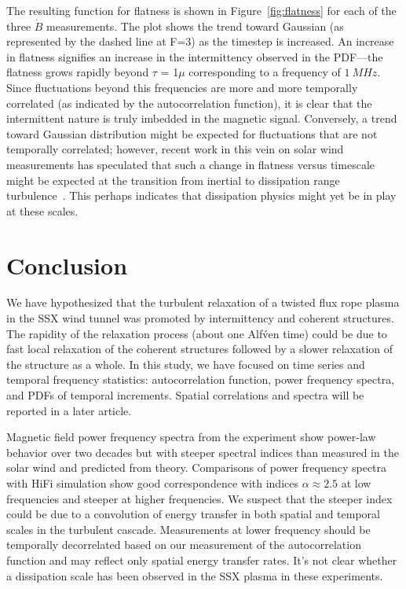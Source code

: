 \documentclass[12pt]{iopart}
\begin{document}
The resulting function for flatness is shown in Figure~\ref{fig:flatness} for each of the three $\dot{B}$ measurements. The plot shows the trend toward Gaussian (as represented by the dashed line at F=3) as the timestep is increased. An increase in flatness signifies an increase in the intermittency observed in the PDF---the flatness grows rapidly beyond $\tau$ = 1$\mu$ corresponding to a frequency of $1~MHz$. Since fluctuations beyond this frequencies are more and more temporally correlated (as indicated by the autocorrelation function), it is clear that the intermittent nature is truly imbedded in the magnetic signal. Conversely, a trend toward Gaussian distribution might be expected for fluctuations that are not temporally correlated; however, recent work in this vein on solar wind measurements has speculated that such a change in flatness versus timescale might be expected at the transition from inertial to dissipation range turbulence~\cite{wan12_apj}. This perhaps indicates that dissipation physics might yet be in play at these scales.

\section{Conclusion}

We have hypothesized that the turbulent relaxation of a twisted flux rope plasma in the SSX wind tunnel was promoted by intermittency and coherent structures.  The rapidity of the relaxation process (about one Alf\'ven time) could be due to fast local relaxation of the coherent structures followed by a slower relaxation of the structure as a whole.  In this study, we have focused on time series and temporal frequency statistics: autocorrelation function, power frequency spectra, and PDFs of temporal increments.  Spatial correlations and spectra will be reported in a later article.

Magnetic field power frequency spectra from the experiment show power-law behavior over two decades but with steeper spectral indices than measured in the solar wind and predicted from theory. Comparisons of power frequency spectra with HiFi simulation show good correspondence with indices $\alpha \approx 2.5$ at low frequencies and steeper at higher frequencies.  We suspect that the steeper index could be due to a convolution of energy transfer in both spatial and temporal scales in the turbulent cascade. Measurements at lower frequency should be temporally decorrelated based on our measurement of the autocorrelation function and may reflect only spatial energy transfer rates.  It's not clear whether a dissipation scale has been observed in the SSX plasma in these experiments.
\end{document}

